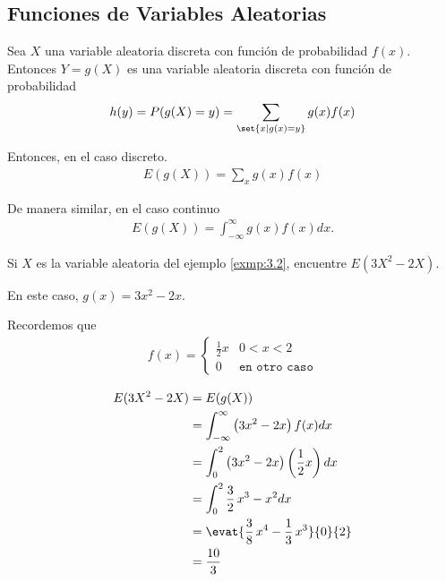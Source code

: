 \subsection{Funciones de Variables Aleatorias}

 Sea $X$ una variable aleatoria discreta con función de probabilidad $f(x).$ Entonces $Y=g(X)$ es una variable aleatoria discreta con función de probabilidad
 \begin{align}
  h(y)=P(g(X)=y)=\sum_{\set{x|g(x)=y}}g(x)f(x)
 \end{align}



 Entonces, en el caso discreto.
 \begin{align}
 \label{eq:3.5}
  E\left( g(X) \right)=
  \sum_{x}g(x)f(x)
 \end{align}

 De manera similar, en el caso continuo
 \begin{align}
  \label{eq:3.6}
  E\left( g(X) \right)=\int_{-\infty}^{\infty}
  g(x)f(x)dx.
 \end{align}




 \begin{ejemplo}
  \label{exmp:3.3}
  Si $X$ es la variable aleatoria del ejemplo \ref{exmp:3.2}, encuentre $E\left( 3X^{2}-2X \right).$
 \end{ejemplo}


{}
En este caso, $g(x)=3x^2-2x.$



Recordemos que
  \begin{align*}
   f(x)=
   \begin{cases}
    \frac{1}{2}x & 0<x<2 \\
    0 & \texttt{en otro caso}
   \end{cases}
  \end{align*}



\begin{align*}
 E(3X^2-2X) &= E(g(X)) \\
  &= \displaystyle \int_{-\infty}^{\infty} \left( 3x^2-2x \right)f(x)dx\\
  &= \displaystyle \int_{0}^{2}\left( 3x^2-2x \right)\left( \dfrac{1}{2}x \right)dx \\
  &= \displaystyle \int_{0}^{2} \frac{3}{2} \, x^{3} - x^{2} dx
 \\  &= \displaystyle \evat{\frac{3}{8} \, x^{4} - \frac{1}{3} \, x^{3}
}{0}{2}
\\  &= \displaystyle
\frac{10}{3}
\end{align*}


